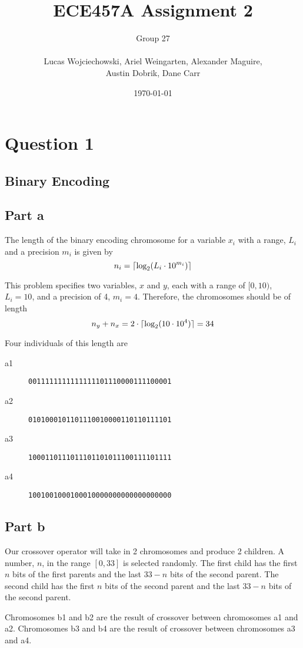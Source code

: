 \documentclass[a4paper]{article}
\title{ECE457A Assignment 2}
\author{
  Group 27 \\
  \\
  Lucas Wojciechowski, Ariel Weingarten, Alexander Maguire, \\
  Austin Dobrik, Dane Carr}
\date{\today}
\DeclarePairedDelimiter\ceil{\lceil}{\rceil}
\begin{document}
\maketitle

\section{Question 1}

\subsection{Binary Encoding}
\subsection{Part a}

The length of the binary encoding chromosome for a variable $x_i$ with a range, $L_i$ and a precision $m_i$ is given by
$$n_i = \ceil{\text{log}_2(L_i \cdot 10^{m_i})}$$

This problem specifies two variables, $x$ and $y$, each with a range of $[0, 10)$, $L_i = 10$, and a precision of 4, $m_i = 4$. Therefore, the chromosomes should be of length
$$n_y + n_x = 2 \cdot \ceil{\text{log}_2(10 \cdot 10^4)} = 34$$

Four individuals of this length are
\begin{description}
\item[a1] \texttt{0011111111111111101110000111100001}
\item[a2] \texttt{0101000101101110010000110110111101}
\item[a3] \texttt{1000110111011101101011100111101111}
\item[a4] \texttt{1001001000100010000000000000000000}
\end{description}

\subsection{Part b}
Our crossover operator will take in 2 chromosomes and produce 2 children. A number, $n$, in the range $[0, 33]$ is selected randomly. The first child has the first $n$ bits of the first parents and the last $33-n$ bits of the second parent. The second child has the first $n$ bits of the second parent and the last $33-n$ bits of the second parent.

Chromosomes b1 and b2 are the result of crossover between chromosomes a1 and a2. Chromosomes b3 and b4 are the result of crossover between chromosomes a3 and a4.
\end{document}

